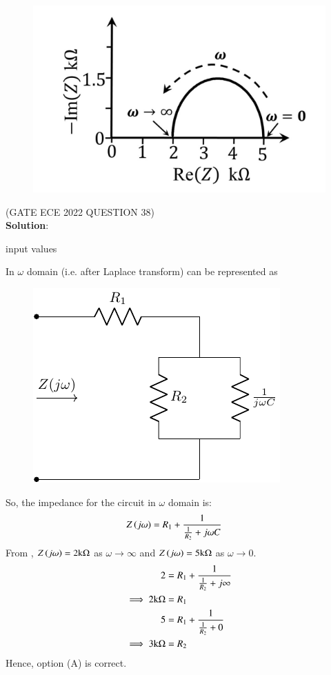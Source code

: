\documentclass[journal,12pt,twocolumn]{IEEEtran}
\theoremstyle{remark}
\begin{document}
\begin{figure}[h!]
    \includegraphics[width = 0.6\columnwidth]{figs/fig_2.png}
    \caption{}
    \centering
    \label{fig: qn_2_fig}
\end{figure}
\hfill(GATE ECE 2022 QUESTION 38)\\
\textbf{Solution}:\\
\begin{table}[h!] 
\centering

\caption{input values}
\label{tab: Table2022ECE38}
\end{table}
In $ \omega$ domain (i.e. after Laplace transform)  can be represented as 
\begin{figure}[h!]
    \includegraphics[width = 0.6\columnwidth]{figs/answer_fig.pdf}
    \caption{}
    \centering
    \label{fig: ans_1_fig}
\end{figure}
So, the impedance for the circuit in $ \omega$ domain is:
\begin{align}
Z\left(j \omega\right) &= R_1 +  \frac{1}{\frac{1}{R_2}+ j\omega C} \label{eq: ece38_1}
\end{align}
From , $ Z\left(j\omega\right)=2\text{k\ohm}$ as $ \omega \to \infty$ and 
$ Z\left(j\omega\right)=5\text{k\ohm}$ as $ \omega \to 0$.
\begin{align}
2 &= R_1 + \frac{1}{\frac{1}{R_2}+ j\infty}\\
\implies 2\text{k\ohm} &= R_1 \label{eq: ece382}\\
5 &= R_1 + \frac{1}{\frac{1}{R_2}+0}\\
\implies 3\text{k\ohm} &= R_2
\end{align}
Hence, option (A) is correct.
\end{document}
